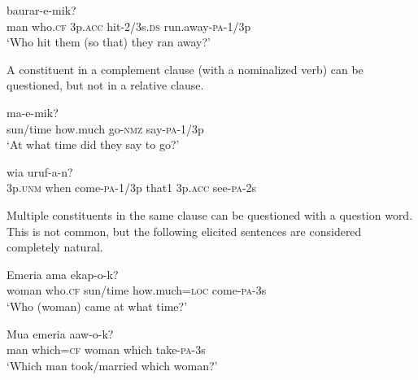 \ea%
\label{ex:7:x1168}
\gll {}        baurar-e-mik? \\
man  who.\textsc{cf}  3p.\textsc{acc}  hit-2/3s.\textsc{ds}  run.away-\textsc{pa}-1/3p      \\
\glt `Who hit them (so that) they ran away?'
\z





A constituent in a complement clause (with a nominalized verb) can be questioned, but not in a relative clause. 

\ea%
\label{ex:7:x1175}
\gll {}      ma-e-mik? \\
sun/time  how.much  go-\textsc{nmz}  say-\textsc{pa}-1/3p      \\
\glt `At what time did they say to go?'
\z





\ea%
\label{ex:7:x1176}
\gll {}        wia  uruf-a-n? \\
3p.\textsc{unm}  when  come-\textsc{pa}-1/3p  that1  3p.\textsc{acc}  see-\textsc{pa}-2s \\
\glt
\z



Multiple constituents in the same clause can be questioned with a question word. This is not common, but the following elicited sentences are considered completely natural. 

\ea%
\label{ex:7:x1177}
\gll Emeria    ama    ekap-o-k? \\
woman  who.\textsc{cf}  sun/time  how.much=\textsc{loc}  come-\textsc{pa}-3s      \\
\glt `Who (woman) came at what time?'
\z





\ea%
\label{ex:7:x1178}
\gll Mua    emeria    aaw-o-k? \\
man  which=\textsc{cf}  woman  which  take-\textsc{pa}-3s      \\
\glt `Which man took/married which woman?'
\z





